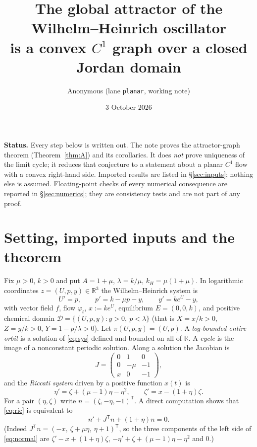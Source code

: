 \documentclass[11pt,a4paper]{article}
\title{The global attractor of the Wilhelm--Heinrich oscillator\\ is a convex $C^1$ graph over a closed Jordan domain}
\author{Anonymous (lane \texttt{planar}, working note)}
\date{3 October 2026}
\numberwithin{equation}{section}
\theoremstyle{remark}\newtheorem{remark}[theorem]{Remark}
\newcommand{\R}{\mathbb R}
\newcommand{\cD}{\mathcal D}
\begin{document}
\maketitle

\noindent\textbf{Status.} Every step below is written out. The note proves the attractor-graph theorem
(Theorem~\ref{thm:A}) and its corollaries. It does \emph{not} prove uniqueness of the limit cycle; it reduces that
conjecture to a statement about a planar $C^1$ flow with a convex right-hand side. Imported results are listed in
\S\ref{sec:inputs}; nothing else is assumed. Floating-point checks of every numerical consequence are reported in
\S\ref{sec:numerics}; they are consistency tests and are not part of any proof.

\section{Setting, imported inputs and the theorem}\label{sec:setting}

Fix $\mu>0$, $k>0$ and put $A=1+\mu$, $\lambda=k/\mu$, $k_H=\mu(1+\mu)$. In logarithmic coordinates
$z=(U,p,y)\in\R^3$ the Wilhelm--Heinrich system is
\begin{equation}\label{eq:sys}
U'=p,\qquad p'=k-\mu p-y,\qquad y'=ke^{U}-y ,
\end{equation}
with vector field $f$, flow $\varphi_t$, $x:=ke^{U}$, equilibrium $E=(0,0,k)$, and positive chemical domain
$\cD=\{(U,p,y):y>0,\ p<\lambda\}$ (that is $X=x/k>0$, $Z=y/k>0$, $Y=1-p/\lambda>0$). Let $\pi(U,p,y)=(U,p)$.
A \emph{log-bounded entire orbit} is a solution of \eqref{eq:sys} defined and bounded on all of $\R$.
A \emph{cycle} is the image of a nonconstant periodic solution. Along a solution the Jacobian is
\[
J=\begin{pmatrix}0&1&0\\0&-\mu&-1\\x&0&-1\end{pmatrix},
\]
and the \emph{Riccati system} driven by a positive function $x(t)$ is
\begin{equation}\label{eq:ric}
\eta'=\zeta+(\mu-1)\eta-\eta^{2},\qquad \zeta'=x-(1+\eta)\zeta .
\end{equation}
For a pair $(\eta,\zeta)$ write $n=(\zeta,-\eta,-1)^{\mathsf T}$. A direct computation shows that \eqref{eq:ric} is
equivalent to
\begin{equation}\label{eq:normal}
n'+J^{\mathsf T}n+(1+\eta)n=0 .
\end{equation}
(Indeed $J^{\mathsf T}n=(-x,\ \zeta+\mu\eta,\ \eta+1)^{\mathsf T}$, so the three components of the left side of
\eqref{eq:normal} are $\zeta'-x+(1+\eta)\zeta$, $-\eta'+\zeta+(\mu-1)\eta-\eta^2$ and $0$.)
\end{document}
